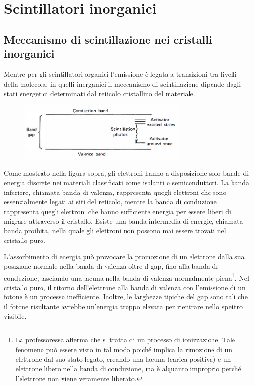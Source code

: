 \section{Scintillatori inorganici}


\subsection{Meccanismo di scintillazione nei cristalli inorganici}
Mentre per gli scintillatori organici l'emissione è legata a transizioni tra livelli della molecola, in quelli inorganici il meccanismo di scintillazione dipende dagli stati energetici determinati dal reticolo cristallino del materiale.
\begin{figure}[H]
   \centering
   \includegraphics[width=0.75\textwidth]{immagini/Livelli_energetici_scintillatori_inorganici.png}
\end{figure}
Come mostrato nella figura sopra, gli elettroni hanno a disposizione solo bande di energia discrete nei materiali classificati come isolanti o semiconduttori. La banda inferiore, chiamata banda di valenza, rappresenta quegli elettroni che sono essenzialmente legati ai siti del reticolo, mentre la banda di conduzione rappresenta quegli elettroni che hanno sufficiente energia per essere liberi di migrare attraverso il cristallo. Esiste una banda intermedia di energie, chiamata banda proibita, nella quale gli elettroni non possono mai essere trovati nel cristallo puro.

L'assorbimento di energia può provocare la promozione di un elettrone dalla sua posizione normale nella banda di valenza oltre il gap, fino alla banda di conduzione, lasciando una lacuna nella banda di valenza normalmente piena\footnote{La professoressa afferma che si tratta di un processo di ionizzazione. Tale fenomeno può essere visto in tal modo poiché implica la rimozione di un elettrone dal suo stato legato, creando una lacuna (carica positiva) e un elettrone libero nella banda di conduzione, ma è alquanto improprio perché l'elettrone non viene veramente liberato.}. Nel cristallo puro, il ritorno dell'elettrone alla banda di valenza con l'emissione di un fotone è un processo inefficiente. Inoltre, le larghezze tipiche del gap sono tali che il fotone risultante avrebbe un'energia troppo elevata per rientrare nello spettro visibile.

